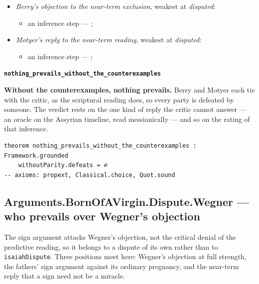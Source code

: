 \documentclass[11pt]{article}
\begin{document}
\begin{itemize}
\begin{itemize}
\item an inference step --- \cite[ad loc. Isa 7:14]{motyer-isaiah-1993}
\item an inference step --- \cite[9--10]{miravalle-meet-mary-2007}
\item an inference step --- \cite[490--493]{postell-isaiah-messianic-2025}
\item an inference step --- \cite[ad loc. Matt 1:23]{france-matthew-2007}
\end{itemize}
\item \emph{Berry's objection to the near-term exclusion}, weakest at \emph{disputed}:
\begin{itemize}
\item an inference step --- \cite[1653--1654]{berry-virgin-birth-2003}; \cite[5]{compton-immanuel-prophecy-2007}
\end{itemize}
\item \emph{Motyer's reply to the near-term reading}, weakest at \emph{disputed}:
\begin{itemize}
\item an inference step --- \cite[124]{motyer-context-content-1970}; \cite[5]{compton-immanuel-prophecy-2007}
\end{itemize}
\end{itemize}
\par\medskip\noindent\textbf{\texttt{nothing\_\allowbreak{}prevails\_\allowbreak{}without\_\allowbreak{}the\_\allowbreak{}counterexamples}}\par\nobreak\noindent
\textbf{Without the counterexamples, nothing prevails.} Berry and Motyer each tie with the critic, as the scriptural reading does, so every party is defeated by someone. The verdict rests on the one kind of reply the critic cannot answer — an oracle on the Assyrian timeline, read messianically — and so on the rating of that inference.

{\small\begin{verbatim}
theorem nothing_prevails_without_the_counterexamples : Framework.grounded
    withoutParity.defeats = ∅
-- axioms: propext, Classical.choice, Quot.sound
\end{verbatim}}
\subsection*{Arguments.BornOfAVirgin.Dispute.Wegner — who prevails over Wegner's objection}
The sign argument attacks Wegner's objection, not the critical denial of the predictive reading, so it belongs to a dispute of its own rather than to \texttt{isaiah\allowbreak{}Dispute}. Three positions meet here: Wegner's objection at full strength, the fathers' sign argument against its ordinary pregnancy, and the near-term reply that a sign need not be a miracle.
\end{document}
